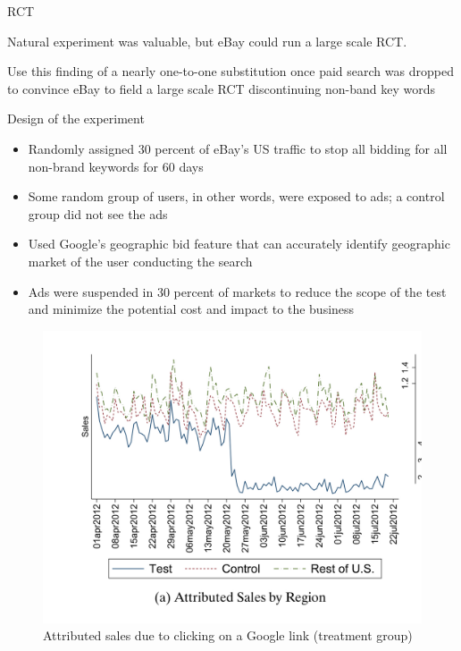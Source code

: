 \documentclass{beamer}
\begin{document}
\begin{frame}{RCT}

Natural experiment was valuable, but eBay could run a large scale RCT.

\bigskip


Use this finding of a nearly one-to-one substitution once paid search was dropped to convince eBay to field a large scale RCT discontinuing non-band key words

\bigskip


\end{frame}

\begin{frame}{Design of the experiment}

\begin{itemize}
\item Randomly assigned 30 percent of eBay's US traffic to stop all bidding for all non-brand keywords for 60 days
\item Some random group of users, in other words, were exposed to ads; a control group did not see the ads
\item Used Google's geographic bid feature that can accurately identify geographic market of the user conducting the search
\item Ads were suspended in 30 percent of markets to reduce the scope of the test and minimize the potential cost and impact to the business
\end{itemize}

\end{frame}

\begin{frame}

\begin{figure}
\begin{center}
\includegraphics[scale=0.2]{./lecture_includes/tadelis_fig3.png}
\caption{Attributed sales due to clicking on a Google link (treatment group)}
\end{center}
\end{figure}

\end{frame}
\end{document}
